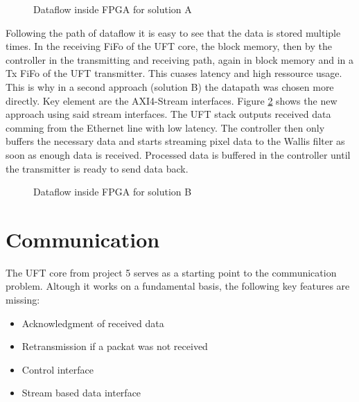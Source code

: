 
\begin{figure}[b!]
    \centering
    \begin{adjustbox}{max width=\textwidth}
    \end{adjustbox}
    \caption{Dataflow inside FPGA for solution A}
    \label{fig:dataflowa}
\end{figure}

Following the path of dataflow it is easy to see that the data is stored
multiple
times. In the receiving FiFo of the UFT core, the block memory, then by the
controller in the transmitting and receiving path, again in block memory and in
a Tx FiFo of the UFT transmitter. This cuases latency and high ressource usage.
This is why in a second approach (solution B) the datapath was chosen more
directly. Key element are the AXI4-Stream interfaces. Figure \ref{fig:dataflowb}
shows the new approach using said stream interfaces. The UFT stack outputs
received data comming from the Ethernet line with low latency. The controller
then only buffers the necessary data and starts streaming pixel data to the
Wallis filter as soon as enough data is received. Processed data is buffered in
the controller until the transmitter is ready to send data back.


\begin{figure}[b!]
    \centering
    \begin{adjustbox}{max width=\textwidth}
    \end{adjustbox}
    \caption{Dataflow inside FPGA for solution B}
    \label{fig:dataflowb}
\end{figure}

\section{Communication}
The UFT core from project 5 serves as a starting point to the communication
problem. Altough it works on a fundamental basis, the following key features are
missing:

\begin{itemize}
	\item Acknowledgment of received data
	\item Retransmission if a packat was not received
	\item Control interface
	\item Stream based data interface
\end{itemize}

